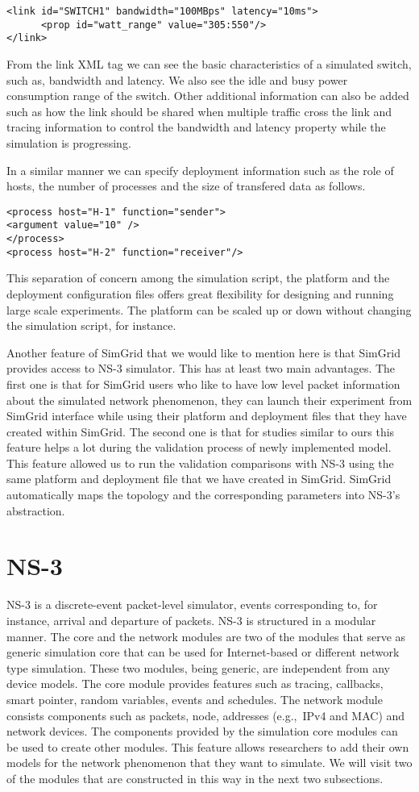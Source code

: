 \begin{lstlisting}
<link id="SWITCH1" bandwidth="100MBps" latency="10ms">
      <prop id="watt_range" value="305:550"/>
</link>
\end{lstlisting}

From the link XML tag we can see the basic characteristics of a simulated switch, such as, bandwidth and latency. We also see the idle and busy power consumption range of the switch. Other additional information can also be added such as how the link should be shared when multiple traffic cross the link and tracing information to control the bandwidth and latency property while the simulation is progressing. 

In a similar manner we can specify deployment information such as the role of hosts, the number of processes and the size of transfered data as follows. 
\begin{lstlisting}
<process host="H-1" function="sender">
<argument value="10" />
</process>
<process host="H-2" function="receiver"/>
\end{lstlisting}
This separation of concern among the simulation script, the platform and the deployment configuration files offers great flexibility for designing and running large scale experiments. The platform can be scaled up or down without changing the simulation script, for instance. 

Another feature of SimGrid that we would like to mention here is that SimGrid provides access to NS-3 simulator. This has at least two main advantages. The first one is that for SimGrid users who like to have low level packet information about the simulated network phenomenon, they can launch their experiment from SimGrid interface while using their platform and deployment files that they have created within SimGrid. The second one is that for studies similar to ours this feature helps a lot during the validation process of newly implemented model. This feature allowed us to run the validation comparisons with NS-3 using the same platform and deployment file that we have created in SimGrid. SimGrid automatically maps the topology and the corresponding parameters into NS-3's abstraction.
\section{NS-3}
NS-3 is a discrete-event packet-level simulator, events corresponding to, for instance, arrival and departure of packets. NS-3 is structured in a modular manner. The core and the network modules are two of the modules that serve as generic simulation core that can be used for Internet-based or different network type simulation. These two modules, being generic, are independent from any device models. The core module provides features such as tracing, callbacks, smart pointer, random variables, events and schedules. The network module consists components such as packets, node, addresses (e.g.,~IPv4 and MAC) and network devices. The components provided by the simulation core modules can be used to create other modules. This feature allows researchers to add their own models for the network phenomenon that they want to simulate. We will visit two of the modules that are constructed in this way in the next two subsections\cite{ns3}. 

